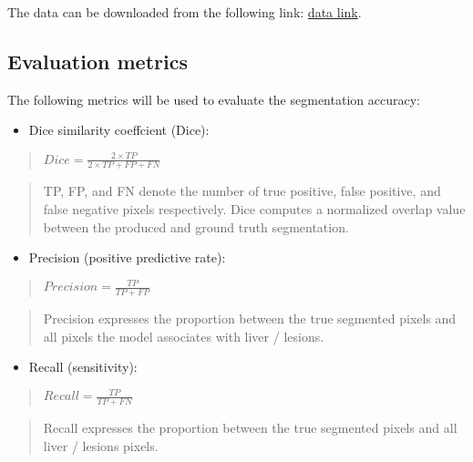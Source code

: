 \documentclass[11pt]{article}
\providecommand{\tightlist}{%
      \setlength{\itemsep}{0pt}\setlength{\parskip}{0pt}}
\begin{document}
The data can be downloaded from the following link:
\href{https://drive.google.com/open?id=1lhYdOFymZSC5Gz76Zt4GzcDYc8nWaWJv}{data
link}.

    \subsection{Evaluation metrics}\label{evaluation-metrics}

The following metrics will be used to evaluate the segmentation
accuracy:

\begin{itemize}
\tightlist
\item
  Dice similarity coeffcient (Dice):
\end{itemize}

\begin{quote}
\(Dice = \frac{2\times TP}{2\times TP+FP+FN}\)
\end{quote}

\begin{quote}
TP, FP, and FN denote the number of true positive, false positive, and
false negative pixels respectively. Dice computes a normalized overlap
value between the produced and ground truth segmentation.
\end{quote}

\begin{itemize}
\tightlist
\item
  Precision (positive predictive rate):
\end{itemize}

\begin{quote}
\(Precision = \frac{TP}{TP + FP}\)
\end{quote}

\begin{quote}
Precision expresses the proportion between the true segmented pixels and
all pixels the model associates with liver / lesions.
\end{quote}

\begin{itemize}
\tightlist
\item
  Recall (sensitivity):
\end{itemize}

\begin{quote}
\(Recall = \frac{TP}{TP + FN}\)
\end{quote}

\begin{quote}
Recall expresses the proportion between the true segmented pixels and
all liver / lesions pixels.
\end{quote}
\end{document}
